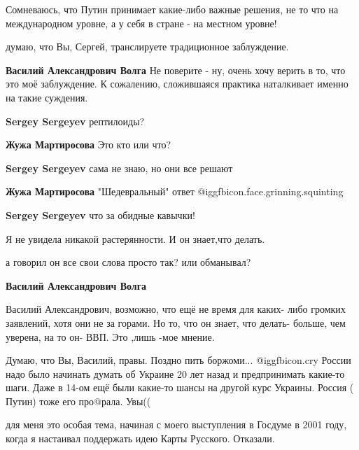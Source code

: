 \begin{itemize}

Сомневаюсь, что Путин принимает какие-либо важные решения, не то что на
международном уровне, а у себя в стране - на местном уровне!

\begin{itemize} %
думаю, что Вы, Сергей, транслируете традиционное заблуждение.

\textbf{Василий Александрович Волга} Не поверите - ну, очень хочу верить в то, что это моё заблуждение. К сожалению, сложившаяся практика наталкивает именно на такие суждения.

\textbf{Sergey Sergeyev} рептилоиды?

\textbf{Жужа Мартиросова} Это кто или что?

\textbf{Sergey Sergeyev} сама не знаю, но они все решают

\textbf{Жужа Мартиросова} "Шедевральный" ответ  @igg{fbicon.face.grinning.squinting} 

\textbf{Sergey Sergeyev} что за обидные кавычки!
\end{itemize} %

Я не увидела никакой растерянности. И он знает,что делать.

\begin{itemize} %
а говорил он все свои слова просто так? или обманывал?

\textbf{Василий Александрович Волга} 

Василий Александрович, возможно, что ещё не время для каких- либо громких
заявлений, хотя они не за горами. Но то, что он знает, что делать- больше, чем
уверена, на то он- ВВП. Это ,лишь -мое мнение.

\end{itemize} %


Думаю, что Вы, Василий, правы. Поздно пить боржоми... @igg{fbicon.cry}  России надо было
начинать думать об Украине 20 лет назад и предпринимать какие-то шаги. Даже в
14-ом ещё были какие-то шансы на другой курс Украины. Россия ( Путин) тоже его
про@рала. Увы((

\begin{itemize} %
для меня это особая тема, начиная с моего выступления в Госдуме в 2001 году, когда я настаивал поддержать идею Карты Русского. Отказали.


\end{itemize}
\end{itemize}
